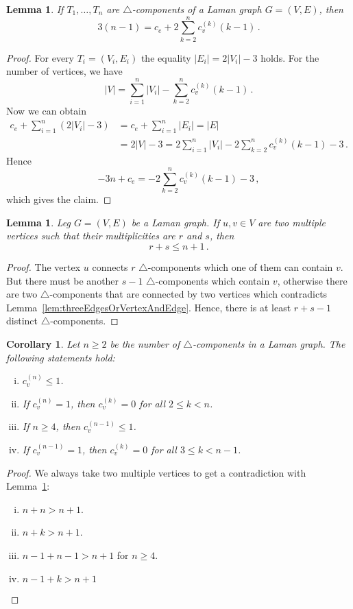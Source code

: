 \documentclass[a4paper, 11pt]{article}
\newcommand{\trcomps}{$\triangle$-components}
\newcommand{\cv}[1]{c_v^{(#1)}}
\newtheorem{lem}[thm]{Lemma}
\newtheorem{cor}[thm]{Corollary}
\theoremstyle{definition}
\begin{document}
\begin{lem}
\label{lem:numCvCe}
If  $T_1, \dots, T_n$ are \trcomps{} of a Laman graph $G=(V,E)$, then
$$
3(n-1)=c_e + 2\sum_{k=2}^n \cv{k}(k-1)\,.
$$
\end{lem}
\begin{proof}
For every $T_i=(V_i,E_i)$ the equality $|E_i|=2|V_i|-3$ holds. For the number of vertices, we have
$$
|V|=\sum_{i=1}^n |V_i| - \sum_{k=2}^n \cv{k}(k-1)\,.
$$
Now we can obtain
\begin{align*}
c_e+\sum_{i=1}^n (2|V_i|-3)&=c_e + \sum_{i=1}^n |E_i|= |E|\\
	&=2|V|-3 = 2\sum_{i=1}^n |V_i| - 2\sum_{k=2}^n \cv{k}(k-1) -3\,.
\end{align*}
Hence
$$-3n + c_e= - 2\sum_{k=2}^n \cv{k}(k-1) -3\,,
$$
which gives the claim.
\end{proof}

\begin{lem}
\label{lem:twoConnectingVertices}
Leg $G=(V,E)$ be a Laman graph. If $u,v\in V$ are two multiple vertices such that their multiplicities are $r$ and $s$, then
$$
r+s\leq n+1\,.
$$
\end{lem}
\begin{proof}
The vertex $u$ connects $r$ \trcomps{} which one of them can contain $v$. But there must be another $s-1$ \trcomps{} which contain $v$, otherwise there are two \trcomps{} that are connected by two vertices which contradicts Lemma~\ref{lem:threeEdgesOrVertexAndEdge}. Hence, there is at least $r+s-1$ distinct \trcomps{}.
\end{proof}

\begin{cor}
\label{cor:validCv}
Let $n\geq 2$ be the number of \trcomps{} in a Laman graph. The following statements hold:
\begin{enumerate}[i)]
	\item $\cv{n} \leq 1$.
	\item If $\cv{n} = 1$, then $\cv{k}=0$ for all $2\leq k<n$.
	\item If $n\geq 4$, then $\cv{n-1} \leq 1$.
	\item If $\cv{n-1} = 1$, then $\cv{k}=0$ for all $3\leq k<n-1$.
\end{enumerate}
\end{cor}
\begin{proof}
We always take two multiple vertices to get a contradiction with Lemma~\ref{lem:twoConnectingVertices}:
\begin{enumerate}[i)]
	\item $n+n >n +1$.
	\item $n +k>n+1$.
	\item $n-1+n-1>n+1$ for $n\geq 4$.
	\item $n-1+k>n+1$
\end{enumerate}
\end{proof}
\end{document}
